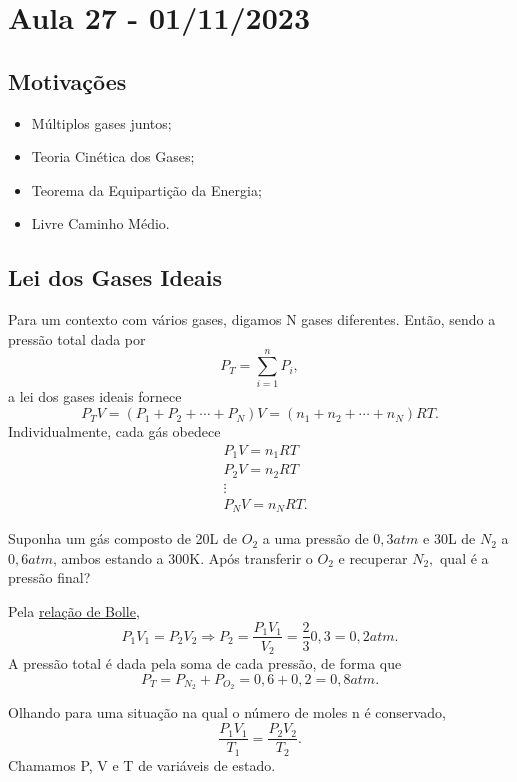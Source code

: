 \documentclass[phsyicsII_notes.tex]{subfiles}
\begin{document}
\section{Aula 27 - 01/11/2023}
\subsection{Motivações}
\begin{itemize}
	\item Múltiplos gases juntos;
	\item Teoria Cinética dos Gases;
	\item Teorema da Equipartição da Energia;
	\item Livre Caminho Médio.
\end{itemize}
\subsection{Lei dos Gases Ideais}
Para um contexto com vários gases, digamos N gases diferentes. Então, sendo a pressão total dada por
\[
	P_{T} = \sum\limits_{i=1}^{n}P_{i},
\]
a lei dos gases ideais fornece
\[
	P_{T}V = (P_{1} + P_{2} + \cdots + P_{N})V = (n_{1} + n_{2} + \cdots + n_{N})RT.
\]
Individualmente, cada gás obedece
\begin{align*}
	 & P_{1}V = n_{1}RT  \\
	 & P_{2}V = n_{2}RT  \\
	 & \vdots            \\
	 & P_{N}V = n_{N}RT.
\end{align*}
\begin{example}
	Suponha um gás composto de 20L de \(O_{2}\) a uma pressão de \(0,3atm\) e 30L de \(N_{2}\) a \(0,6atm\), ambos estando
	a 300K. Após transferir o \(O_{2}\) e recuperar \(N_{2},\) qual é a pressão final?

	Pela \hyperlink{boyle}{relação de Bolle},
	\[
		P_{1}V_{1} = P_{2}V_{2} \Rightarrow P_{2} = \frac{P_{1}V_{1}}{V_{2}} = \frac{2}{3}0,3 = 0,2atm.
	\]
	A pressão total é dada pela soma de cada pressão, de forma que
	\[
		P_{T} = P_{N_{2}} + P_{O_{2}} = 0,6 + 0,2 = 0,8atm.
	\]
\end{example}

Olhando para uma situação na qual o número de moles n é conservado,
\[
	\frac{P_{1}V_{1}}{T_{1}} = \frac{P_{2}V_{2}}{T_{2}}.
\]
Chamamos P, V e T de variáveis de estado.
\end{document}
